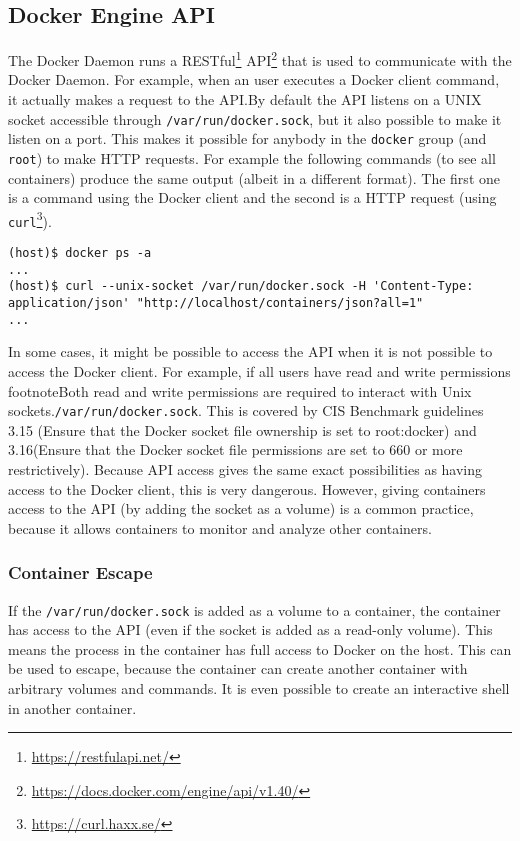 \subsection{Docker Engine API}\label{subsection:api}

The Docker Daemon runs a RESTful\footnote{\url{https://restfulapi.net/}} API\footnote{\url{https://docs.docker.com/engine/api/v1.40/}} that is used to communicate with the Docker Daemon. For example, when an user executes a Docker client command, it actually makes a request to the API.\@ By default the API listens on a UNIX socket accessible through \lstinline{/var/run/docker.sock}, but it also possible to make it listen on a port. This makes it possible for anybody in the \lstinline{docker} group (and \lstinline{root}) to make HTTP requests. For example the following commands (to see all containers) produce the same output (albeit in a different format). The first one is a command using the Docker client and the second is a HTTP request (using \lstinline{curl}\footnote{\url{https://curl.haxx.se/}}).
\begin{lstlisting}[caption={Docker client and Socket.},captionpos=b]
(host)$ docker ps -a
...
(host)$ curl --unix-socket /var/run/docker.sock -H 'Content-Type: application/json' "http://localhost/containers/json?all=1"
...
\end{lstlisting}

\hfill

In some cases, it might be possible to access the API when it is not possible to access the Docker client. For example, if all users have read and write permissions footnote{Both read and write permissions  are required to interact with Unix sockets.}\lstinline{/var/run/docker.sock}. This is covered by CIS Benchmark guidelines 3.15 (Ensure that the Docker socket file ownership is set to root:docker) and 3.16(Ensure that the Docker socket file permissions are set to 660 or more restrictively).
Because API access gives the same exact possibilities as having access to the Docker client, this is very dangerous\cite{The-Dangers-Of-Docker-Sock}.
However, giving containers access to the API (by adding the socket as a volume) is a common practice, because it allows containers to monitor and analyze other containers.

\subsubsection{Container Escape}
If the \lstinline{/var/run/docker.sock} is added as a volume to a container, the container has access to the API (even if the socket is added as a read-only volume\cite{The-Dangers-Of-Docker-Sock}\cite{Read-Only-Docker-Socket-Tweet}\cite{Read-Only-Docker-Socket-Hackernews}). This means the process in the container has full access to Docker on the host. This can be used to escape, because the container can create another container with arbitrary volumes and commands. It is even possible to create an interactive shell in another container\cite{Escape-Socket-Shell}.

